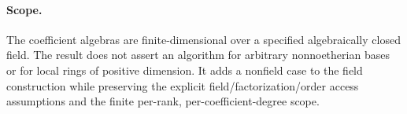 \paragraph{Scope.}
The coefficient algebras are finite-dimensional over a specified
algebraically closed field. The result does not assert an algorithm for
arbitrary nonnoetherian bases or for local rings of positive dimension.
It adds a nonfield case to the field construction while preserving the
explicit field/factorization/order access assumptions and the finite
per-rank, per-coefficient-degree scope.
